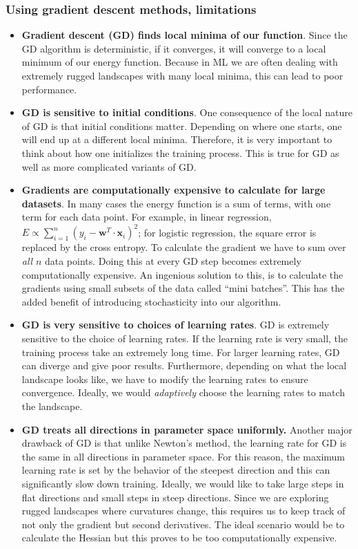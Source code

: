 \documentclass{beamer}
\begin{document}
\begin{frame}
\frametitle{Using gradient descent methods, limitations}

\begin{itemize}
\item \textbf{Gradient descent (GD) finds local minima of our function}. Since the GD algorithm is deterministic, if it converges, it will converge to a local minimum of our energy function. Because in ML we are often dealing with extremely rugged landscapes with many local minima, this can lead to poor performance.

\item \textbf{GD is sensitive to initial conditions}. One consequence of the local nature of GD is that initial conditions matter. Depending on where one starts, one will end up at a different local minima. Therefore, it is very important to think about how one initializes the training process. This is true for GD as well as more complicated variants of GD.

\item \textbf{Gradients are computationally expensive to calculate for large datasets}. In many cases the energy function is a sum of terms, with one term for each data point. For example, in linear regression, $E \propto \sum_{i=1}^n (y_i - \mathbf{w}^T\cdot\mathbf{x}_i)^2$; for logistic regression, the square error is replaced by the cross entropy. To calculate the gradient we have to sum over \emph{all} $n$ data points. Doing this at every GD step becomes extremely computationally expensive. An ingenious solution to this, is to calculate the gradients using small subsets of the data called ``mini batches''. This has the added benefit of introducing stochasticity into our algorithm.

\item \textbf{GD is very sensitive to choices of learning rates}. GD is extremely sensitive to the choice of learning rates. If the learning rate is very small, the training process take an extremely long time. For larger learning rates, GD can diverge and give poor results. Furthermore, depending on what the local landscape looks like, we have to modify the learning rates to ensure convergence. Ideally, we would \emph{adaptively} choose the learning rates to match the landscape.

\item \textbf{GD treats all directions in parameter space uniformly.} Another major drawback of GD is that unlike Newton's method, the learning rate for GD is the same in all directions in parameter space. For this reason, the maximum learning rate is set by the behavior of the steepest direction and this can significantly slow down training. Ideally, we would like to take large steps in flat directions and small steps in steep directions. Since we are exploring rugged landscapes where curvatures change, this requires us to keep track of not only the gradient but second derivatives. The ideal scenario would be to calculate the Hessian but this proves to be too computationally expensive. 


\end{itemize}
\end{frame}
\end{document}
